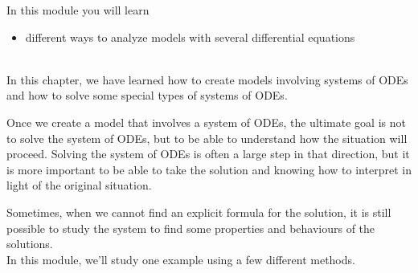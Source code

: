 In this module you will learn
\begin{itemize}
	\item different ways to analyze models with several differential equations
\end{itemize}

\hfill \\



In this chapter, we have learned how to create models involving systems of ODEs and how to solve some special types of systems of ODEs.

Once we create a model that involves a system of ODEs, the ultimate goal is not to solve the system of ODEs, but to be able to understand how the situation will proceed.
Solving the system of ODEs is often a large step in that direction, but it is more important to be able to take the solution and knowing how to interpret in light of the original situation.

Sometimes, when we cannot find an explicit formula for the solution, it is still possible to study the system to find some properties and behaviours of the solutions. \\

In this module, we'll study one example using a few different methods.


